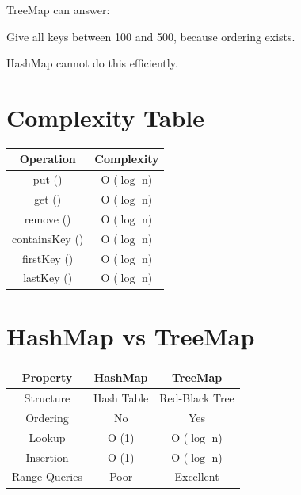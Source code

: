 \documentclass[11pt,a4paper]{book}
\begin{document}
TreeMap can answer:

Give all keys between 100 and 500,
because ordering exists.

HashMap \textcolor{RosettaOrange}{cannot} do this efficiently.

\section{Complexity Table}

\begin{center}

\begin{tabular}{|c|c|}
\hline
\textbf{Operation} & \textbf{Complexity} \\
\hline

put ()
&
O ($\log$ n)
\\
\hline

get ()
&
O ($\log$ n)
\\
\hline

remove ()
&
O ($\log$ n)
\\
\hline

containsKey ()
&
O ($\log$ n)
\\
\hline

firstKey ()
&
O ($\log$ n)
\\
\hline

lastKey ()
&
O ($\log$ n)
\\
\hline

\end{tabular}

\end{center}


\section{HashMap vs TreeMap}

\begin{center}

\begin{tabular}{|c|c|c|}
\hline
\textbf{Property} &
\textbf{HashMap} &
\textbf{TreeMap} \\
\hline

Structure &
Hash Table &
Red-Black Tree \\
\hline

Ordering &
No &
Yes \\
\hline

Lookup &
O (1) &
O ($\log$ n) \\
\hline

Insertion &
O (1) &
O ($\log$ n) \\
\hline

Range Queries &
Poor &
Excellent \\
\hline

\end{tabular}

\end{center}
\end{document}
